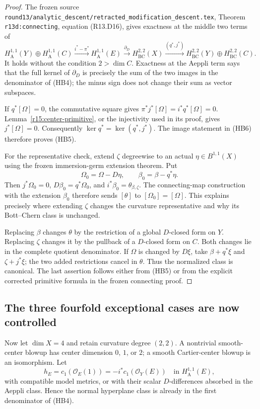 \begin{proof}
The frozen source
\texttt{round13/analytic\_descent/retracted\_modification\_descent.tex},
Theorem \texttt{r13d:connecting}, equation (R13.D16), gives exactness
at the middle two terms of
\[
 H_{\mathrm A}^{1,1}(Y)\oplus H_{\mathrm A}^{1,1}(C)
 \xrightarrow{i^*-\pi^*}H_{\mathrm A}^{1,1}(E)
 \xrightarrow{\partial_D}H_{\mathrm{BC}}^{2,2}(X)
 \xrightarrow{(q^*,j^*)}
 H_{\mathrm{BC}}^{2,2}(Y)\oplus H_{\mathrm{BC}}^{2,2}(C).
\tag{HB6}
\]
It holds without the condition $2>\dim C$. Exactness at the Aeppli
term says that the full kernel of $\partial_D$ is precisely the sum
of the two images in the denominator of (HB4); the minus sign does
not change their sum as vector subspaces.

If $q^*[\Omega]=0$, the commutative square gives
$\pi^*j^*[\Omega]=i^*q^*[\Omega]=0$. Lemma~\ref{r15:center-primitive},
or the injectivity used in its proof, gives $j^*[\Omega]=0$.
Consequently $\ker q^*=\ker(q^*,j^*)$. The image statement in (HB6)
therefore proves (HB5).

For the representative check, extend $\zeta$ degreewise to an actual
$\eta\in B^{1,1}(X)$ using the frozen immersion-germ extension theorem.
Put
\[
 \Omega_0=\Omega-D\eta,\qquad
 \beta_0=\beta-q^*\eta.
\tag{HB7}
\]
Then $j^*\Omega_0=0$, $D\beta_0=q^*\Omega_0$, and
$i^*\beta_0=\theta_{\beta,\zeta}$. The connecting-map construction
with the extension $\beta_0$ therefore sends $[\theta]$ to
$[\Omega_0]=[\Omega]$. This explains precisely where extending
$\zeta$ changes the curvature representative and why its
Bott--Chern class is unchanged.

Replacing $\beta$ changes $\theta$ by the restriction of a global
$D$-closed form on $Y$. Replacing $\zeta$ changes it by the pullback
of a $D$-closed form on $C$. Both changes lie in the complete
quotient denominator. If $\Omega$ is changed by $D\xi$, take
$\beta+q^*\xi$ and $\zeta+j^*\xi$; the two added restrictions cancel
in $\theta$. Thus the normalized class is canonical. The last
assertion follows either from (HB5) or from the explicit corrected
primitive formula in the frozen connecting proof.
\end{proof}

\subsection{The three fourfold exceptional cases are now controlled}

Now let $\dim X=4$ and retain curvature degree $(2,2)$.
A nontrivial smooth-center blowup has center dimension $0$, $1$, or
$2$; a smooth Cartier-center blowup is an isomorphism.
Let
\[
 h_E=c_1(\mathcal O_E(1))=-i^*c_1(\mathcal O_Y(E))
 \quad\text{in }H_{\mathrm A}^{1,1}(E),
\tag{HB8}
\]
with compatible model metrics, or with their scalar $D$-differences
absorbed in the Aeppli class. Hence the normal hyperplane class is
already in the first denominator of (HB4).

